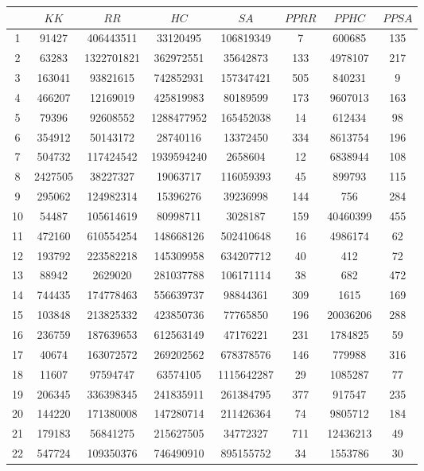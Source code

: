 \documentclass[solution, letterpaper]{cs121}
\begin{document}
\begin{center}
\begin{tabular}{ c |c c c c c c c}
   & $KK$ & $RR$ & $HC$ & $SA$ & $PPRR$ & $PPHC$ & $PPSA$  \\
   \hline
1 & 91427 & 406443511 & 33120495 & 106819349 & 7 & 600685 & 135 \\
2 & 63283 & 1322701821 & 362972551 & 35642873 & 133 & 4978107 & 217 \\
3 & 163041 & 93821615 & 742852931 & 157347421 & 505 & 840231 & 9 \\
4 & 466207 & 12169019 & 425819983 & 80189599 & 173 & 9607013 & 163 \\
5 & 79396 & 92608552 & 1288477952 & 165452038 & 14 & 612434 & 98 \\
6 & 354912 & 50143172 & 28740116 & 13372450 & 334 & 8613754 & 196 \\
7 & 504732 & 117424542 & 1939594240 & 2658604 & 12 & 6838944 & 108 \\
8 & 2427505 & 38227327 & 19063717 & 116059393 & 45 & 899793 & 115 \\
9 & 295062 & 124982314 & 15396276 & 39236998 & 144 & 756 & 284 \\
10 & 54487 & 105614619 & 80998711 & 3028187 & 159 & 40460399 & 455 \\
11 & 472160 & 610554254 & 148668126 & 502410648 & 16 & 4986174 & 62 \\
12 & 193792 & 223582218 & 145309958 & 634207712 & 40 & 412 & 72 \\
13 & 88942 & 2629020 & 281037788 & 106171114 & 38 & 682 & 472 \\
14 & 744435 & 174778463 & 556639737 & 98844361 & 309 & 1615 & 169 \\
15 & 103848 & 213825332 & 423850736 & 77765850 & 196 & 20036206 & 288 \\
16 & 236759 & 187639653 & 612563149 & 47176221 & 231 & 1784825 & 59 \\
17 & 40674 & 163072572 & 269202562 & 678378576 & 146 & 779988 & 316 \\
18 & 11607 & 97594747 & 63574105 & 1115642287 & 29 & 1085287 & 77 \\
19 & 206345 & 336398345 & 241835911 & 261384795 & 377 & 917547 & 235 \\
20 & 144220 & 171380008 & 147280714 & 211426364 & 74 & 9805712 & 184 \\
21 & 179183 & 56841275 & 215627505 & 34772327 & 711 & 12436213 & 49 \\
22 & 547724 & 109350376 & 746490910 & 895155752 & 34 & 1553786 & 30 \\

\end{tabular}
\end{center}
\end{document}
